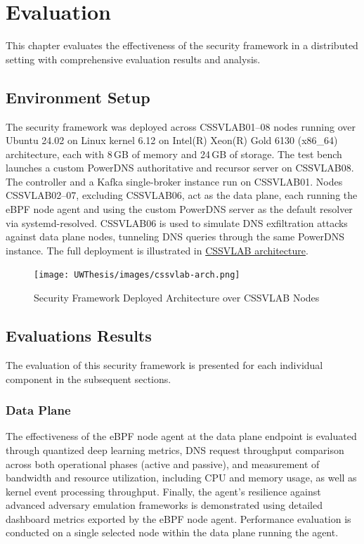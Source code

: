 \documentclass [11pt, proquest] {uwthesis}[2020/02/24]
\begin{document}





\chapter{Evaluation}
This chapter evaluates the effectiveness of the security framework in a distributed setting with  comprehensive evaluation results and analysis.


\section{Environment Setup}
The security framework was deployed across CSSVLAB{01–08} nodes running over Ubuntu 24.02 on Linux kernel 6.12 on Intel(R) Xeon(R) Gold 6130 (x86\_64) architecture, each with 8 GB of memory and 24 GB of storage. The test bench launches a custom PowerDNS authoritative and recursor server on CSSVLAB08. The controller and a Kafka single-broker instance run on CSSVLAB01. Nodes CSSVLAB{02–07}, excluding CSSVLAB06, act as the data plane, each running the eBPF node agent and using the custom PowerDNS server as the default resolver via systemd-resolved. CSSVLAB06 is used to simulate DNS exfiltration attacks against data plane nodes, tunneling DNS queries through the same PowerDNS instance. The full deployment is illustrated in \hyperref[sec:deployed-arch]{CSSVLAB architecture}.


\begin{figure}[H]
\centering
\texttt{[image: UWThesis/images/cssvlab-arch.png]}
\caption{Security Framework Deployed Architecture over CSSVLAB Nodes}
\label{sec:deployed-arch}
\end{figure}


\section{Evaluations Results}
The evaluation of this security framework is presented for each individual component in the subsequent sections.

\subsection{Data Plane}
The effectiveness of the eBPF node agent at the data plane endpoint is evaluated through quantized deep learning metrics, DNS request throughput comparison across both operational phases (active and passive), and measurement of bandwidth and resource utilization, including CPU and memory usage, as well as kernel event processing throughput. Finally, the agent’s resilience against advanced adversary emulation frameworks is demonstrated using detailed dashboard metrics exported by the eBPF node agent. Performance evaluation is conducted on a single selected node within the data plane running the agent.
\end{document}
